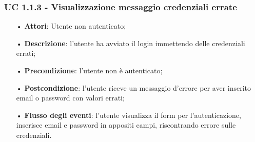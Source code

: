 \subsubsection{UC 1.1.3 - Visualizzazione messaggio credenziali errate}
\begin{itemize}
\item[•]\textbf{Attori}: Utente non autenticato;
\item[•]\textbf{Descrizione}: l'utente ha avviato il login immettendo delle credenziali errati;
\item[•]\textbf{Precondizione}: l'utente non è autenticato;
\item[•]\textbf{Postcondizione}: l'utente riceve un messaggio d'errore per aver inserito email o password con valori errati;
\item[•]\textbf{Flusso degli eventi}: l'utente visualizza il form per l'autenticazione, inserisce email e password in appositi campi, riscontrando errore sulle credenziali.
\end{itemize}

